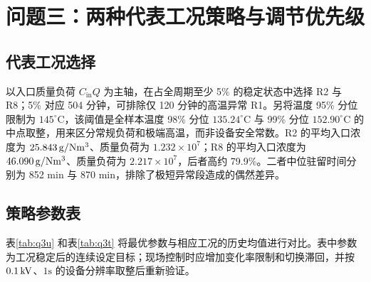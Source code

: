 \section{问题三：两种代表工况策略与调节优先级}

\subsection{代表工况选择}

以入口质量负荷 $C_{\mathrm{in}}Q$ 为主轴，在占全周期至少 5\% 的稳定状态中选择 R2 与 R8；5\% 对应 504 分钟，可排除仅 120 分钟的高温异常 R1。另将温度 95\% 分位限制为 $145^\circ\mathrm C$，该阈值是全样本温度 98\% 分位 $135.24^\circ\mathrm C$ 与 99\% 分位 $152.90^\circ\mathrm C$ 的中点取整，用来区分常规负荷和极端高温，而非设备安全常数。R2 的平均入口浓度为 $25.843\,\mathrm{g/Nm^3}$、质量负荷为 $1.232\times10^7$；R8 的平均入口浓度为 $46.090\,\mathrm{g/Nm^3}$、质量负荷为 $2.217\times10^7$，后者高约 79.9\%。二者中位驻留时间分别为 852 min 与 870 min，排除了极短异常段造成的偶然差异。

\subsection{策略参数表}

表\ref{tab:q3u} 和表\ref{tab:q3t} 将最优参数与相应工况的历史均值进行对比。表中参数为工况稳定后的连续设定目标；现场控制时应增加变化率限制和切换滞回，并按 $0.1\,\mathrm{kV}$、$1\mathrm s$ 的设备分辨率取整后重新验证。

\begin{table}[H]
\centering
\caption{低、高负荷代表工况的电压策略}
\label{tab:q3u}
\end{table}

\begin{table}[H]
\centering
\caption{低、高负荷代表工况的振打与风险指标}
\label{tab:q3t}
\end{table}

